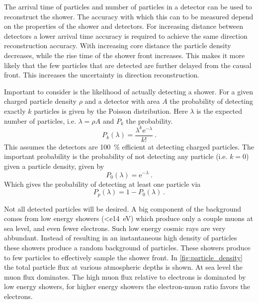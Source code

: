 The arrival time of particles and number of particles in a detector can be used to reconstruct the shower. The accuracy with which this can to be measured depend on the properties of the shower and detectors. For increasing distance between detectors a lower arrival time accuracy is required to achieve the same direction reconstruction accuracy. With increasing core distance the particle density decreases, while the rise time of the shower front increases. This makes it more likely that the few particles that are detected are further delayed from the causal front. This increases the uncertainty in direction reconstruction.

Important to consider is the likelihood of actually detecting a shower. For a given charged particle density $\rho$ and a detector with area $A$ the probability of detecting exactly $k$ particles is given by the Poisson distribution. Here $\lambda$ is the expected number of particles, i.e. $\lambda = \rho A$ and $P_k$ the probability.
%
\begin{equation}
    P_k(\lambda) = \frac{\lambda^k \mathrm{e}^{-\lambda}}{k!} \ .
\end{equation}
%
This assumes the detectors are \SI{100}{\percent} efficient at detecting charged particles. The important probability is the probability of not detecting any particle (i.e. $k = 0$) given a particle density, given by
%
\begin{equation}
    P_0(\lambda) = \mathrm{e}^{-\lambda} \ .
\end{equation}
%
Which gives the probability of detecting at least one particle via
%
\begin{equation}
    P_p(\lambda) = 1-P_0(\lambda) \ .
\end{equation}

Not all detected particles will be desired. A big component of the background comes from low energy showers (\SI{<e14}{\eV}) which produce only a couple muons at sea level, and even fewer electrons. Such low energy cosmic rays are very abbundant. Instead of resulting in an instantaneous high density of particles these showers produce a random background of particles. These showers produce to few particles to effectively sample the shower front. In \cref{fig:particle_density} the total particle flux at various atmospheric depths is shown. At sea level the muon flux dominates. The high muon flux relative to electrons is dominated by low energy showers, for higher energy showers the electron-muon ratio favors the electrons.

